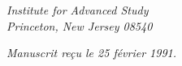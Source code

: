\documentclass[12pt,a4paper]{article}
\theoremstyle{plain}
\theoremstyle{definition}
\theoremstyle{remark}
\begin{document}
\vspace{1cm}
\begin{flushright}
\textit{Institute for Advanced Study}\\
\textit{Princeton, New Jersey 08540}
\end{flushright}

\vspace{0.5cm}
\begin{flushright}
\textit{Manuscrit reçu le 25 février 1991.}
\end{flushright}
\end{document}
